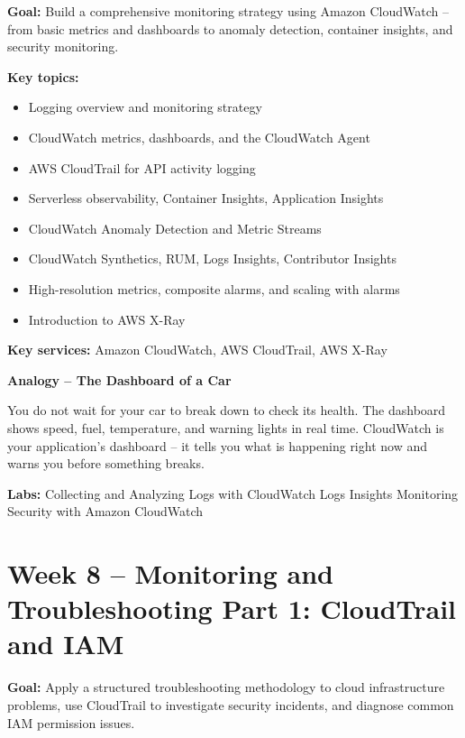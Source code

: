 \documentclass[12pt,a4paper]{article}
\begin{document}
\textbf{Goal:} Build a comprehensive monitoring strategy using Amazon CloudWatch --
from basic metrics and dashboards to anomaly detection, container insights, and
security monitoring.

\textbf{Key topics:}
\begin{itemize}[leftmargin=1.5em]
  \item Logging overview and monitoring strategy
  \item CloudWatch metrics, dashboards, and the CloudWatch Agent
  \item AWS CloudTrail for API activity logging
  \item Serverless observability, Container Insights, Application Insights
  \item CloudWatch Anomaly Detection and Metric Streams
  \item CloudWatch Synthetics, RUM, Logs Insights, Contributor Insights
  \item High-resolution metrics, composite alarms, and scaling with alarms
  \item Introduction to AWS X-Ray
\end{itemize}

\textbf{Key services:} Amazon CloudWatch, AWS CloudTrail, AWS X-Ray

\begin{analogybox}
\textbf{Analogy -- The Dashboard of a Car}

You do not wait for your car to break down to check its health. The dashboard shows
speed, fuel, temperature, and warning lights in real time. CloudWatch is your
application's dashboard -- it tells you what is happening right now and warns you
before something breaks.
\end{analogybox}

\textbf{Labs:} Collecting and Analyzing Logs with CloudWatch Logs Insights
\textbullet{} Monitoring Security with Amazon CloudWatch

\newpage

\section{Week 8 -- Monitoring and Troubleshooting Part 1: CloudTrail and IAM}

\textbf{Goal:} Apply a structured troubleshooting methodology to cloud infrastructure
problems, use CloudTrail to investigate security incidents, and diagnose common IAM
permission issues.
\end{document}
